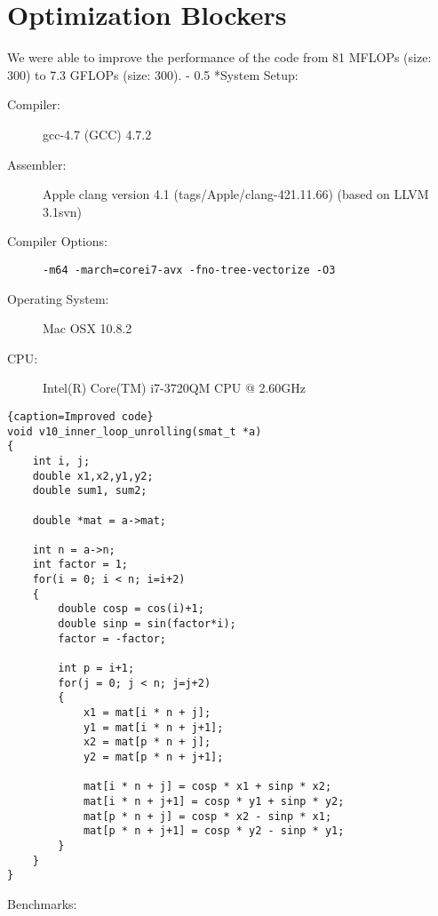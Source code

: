 \documentclass[portrait,a4paper]{article}
\makeatletter
\renewcommand\paragraph{\@startsection{paragraph}{4}{0mm}%
    {-\baselineskip}%
    {0.5\baselineskip}%
    {\normalfont\bfseries}%
}%
\makeatother
\begin{document}
\section{Optimization Blockers}
We were able to improve the performance of the code from 81 MFLOPs (size: 300) to 7.3 GFLOPs (size: 300). 
\paragraph*{System Setup:}
\begin{description}
    \item[Compiler:] gcc-4.7 (GCC) 4.7.2
    \item[Assembler:] Apple clang version 4.1 (tags/Apple/clang-421.11.66) (based on LLVM 3.1svn)
    \item[Compiler Options:] \lstinline{-m64 -march=corei7-avx -fno-tree-vectorize -O3}
    \item[Operating System:] Mac OSX 10.8.2
    \item[CPU:] Intel(R) Core(TM) i7-3720QM CPU @ 2.60GHz
\end{description}
\lstset{language=C}
\begin{lstlisting}{caption=Improved code}
void v10_inner_loop_unrolling(smat_t *a)
{
    int i, j;
    double x1,x2,y1,y2;
    double sum1, sum2;

    double *mat = a->mat;

    int n = a->n;
    int factor = 1;
    for(i = 0; i < n; i=i+2)        
    {   
        double cosp = cos(i)+1;
        double sinp = sin(factor*i);
        factor = -factor;
        
        int p = i+1;        
        for(j = 0; j < n; j=j+2)
        {        
            x1 = mat[i * n + j];
            y1 = mat[i * n + j+1]; 
            x2 = mat[p * n + j];
            y2 = mat[p * n + j+1];

            mat[i * n + j] = cosp * x1 + sinp * x2;
            mat[i * n + j+1] = cosp * y1 + sinp * y2;
            mat[p * n + j] = cosp * x2 - sinp * x1;      
            mat[p * n + j+1] = cosp * y2 - sinp * y1;  
        }    
    }
}

\end{lstlisting}
Benchmarks:
\end{document}
